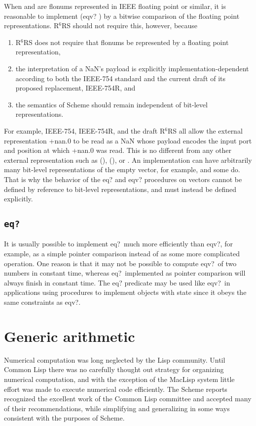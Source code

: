 \documentclass[twoside,twocolumn]{algol60}
\newcommand{\rn}[1]{R$^{#1}$RS}
\begin{document}
When  and  are flonums represented in IEEE floating
point or similar, it is reasonable to implement {\cf (eqv? 
  )} by a bitwise comparison of the floating point
representations.  \rn{6} should not require this, however, because
%
\begin{enumerate}
\item \rn{6} does not require that flonums be represented by a
  floating point representation,
\item the interpretation of a NaN's payload is explicitly
  implementation-dependent according to both the IEEE-754 standard and
  the current draft of its proposed replacement, IEEE-754R, and
\item the semantics of Scheme should remain independent
  of bit-level representations.
\end{enumerate}
%
For example, IEEE-754, IEEE-754R, and the draft \rn{6} all allow the
external representation {\cf +nan.0} to be read as a NaN whose payload
encodes the input port and position at which {\cf +nan.0} was read.
This is no different from any other external representation such as
{\cf ()}, {\cf \sharpsign()}, or {}.  An implementation can
have arbitrarily many bit-level representations of the empty vector,
for example, and some do.  That is why the behavior of the {\cf eq?}
and {\cf eqv?} procedures on vectors cannot be defined by reference to
bit-level representations, and must instead be defined explicitly.

\subsection{{\tt eq?}}

It is usually possible to implement {\cf eq?}\ much more efficiently
than {\cf eqv?}, for example, as a simple pointer comparison instead
of as some more complicated operation.  One reason is that it may not
be possible to compute {\cf eqv?}\ of two numbers in constant time,
whereas {\cf eq?}\ implemented as pointer comparison will always
finish in constant time.  The {\cf eq?} predicate may be used like
{\cf eqv?}\ in applications using procedures to implement objects with
state since it obeys the same constraints as {\cf eqv?}.

\section{Generic arithmetic}

Numerical computation was long neglected by the Lisp community.  Until
Common Lisp there was no carefully thought out strategy for organizing
numerical computation, and with the exception of the MacLisp system
\cite{Pitman83} little effort was made to execute numerical code
efficiently.  The Scheme reports recognized the excellent work of the
Common Lisp committee and accepted many of their recommendations,
while simplifying and generalizing in some ways consistent with the
purposes of Scheme.
\end{document}
